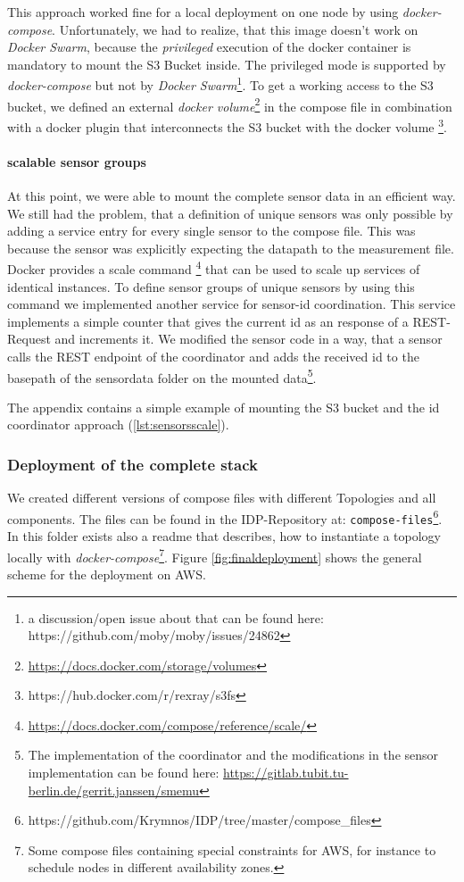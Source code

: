 This approach worked fine for a local deployment on one node by using \emph{docker-compose}. Unfortunately, we had to realize, that this image doesn't work on \emph{Docker Swarm}, because the \emph{privileged} execution of the docker container is mandatory to mount the S3 Bucket inside. The privileged mode is supported by \emph{docker-compose} but not by \emph{Docker Swarm}\footnote{a discussion/open issue about that can be found here: https://github.com/moby/moby/issues/24862}.
To get a working access to the S3 bucket, we defined an external \emph{docker volume}\footnote{\url{https://docs.docker.com/storage/volumes}} in the compose file in combination with a docker plugin that interconnects the S3 bucket with the docker volume \footnote{https://hub.docker.com/r/rexray/s3fs}.

\paragraph*{scalable sensor groups}
At this point, we were able to mount the complete sensor data in an efficient way. We still had the problem, that a definition of unique sensors was only possible by adding a service entry for every single sensor to the compose file.
This was because the sensor was explicitly expecting the datapath to the measurement file.
Docker provides a scale command \footnote{\url{https://docs.docker.com/compose/reference/scale/}} that can be used to scale up services of identical instances. To define sensor groups of unique sensors by using this command we implemented another service for sensor-id coordination. This service implements a simple counter that gives the current id as an response of a REST-Request and increments it.
We modified the sensor code in a way, that a sensor calls the REST endpoint of the coordinator and adds the received id to the basepath of the sensordata folder on the mounted data\footnote{The implementation of the coordinator and the modifications in the sensor implementation can be found here: \url{https://gitlab.tubit.tu-berlin.de/gerrit.janssen/smemu}}. 

The appendix contains a simple example of mounting the S3 bucket and the id coordinator approach (\ref{lst:sensorsscale}).

\subsubsection*{Deployment of the complete stack}
We created different versions of compose files with different Topologies and all components. The files can be found in the IDP-Repository at: \texttt{compose-files}\footnote{https://github.com/Krymnos/IDP/tree/master/compose\_files}. In this folder exists also a readme that describes, how to instantiate a topology locally  with \emph{docker-compose}\footnote{ Some compose files containing special constraints for AWS, for instance to schedule nodes in different availability zones.}. Figure \ref{fig:finaldeployment} shows the general scheme for the deployment on AWS.

